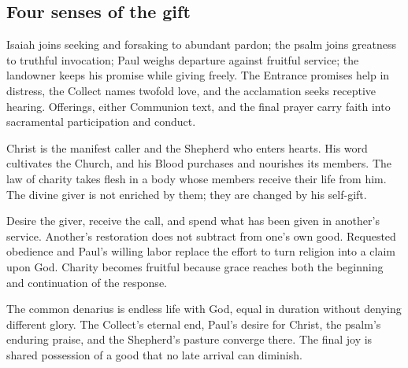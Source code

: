 \subsection{Four senses of the gift}
\begin{fourSenses}
\item[Literal.] Isaiah joins seeking and forsaking to abundant pardon; the psalm joins greatness to truthful invocation; Paul weighs departure against fruitful service; the landowner keeps his promise while giving freely. The Entrance promises help in distress, the Collect names twofold love, and the acclamation seeks receptive hearing. Offerings, either Communion text, and the final prayer carry faith into sacramental participation and conduct.

\item[Allegorical.] Christ is the manifest caller and the Shepherd who enters hearts. His word cultivates the Church, and his Blood purchases and nourishes its members. The law of charity takes flesh in a body whose members receive their life from him. The divine giver is not enriched by them; they are changed by his self-gift.

\item[Moral.] Desire the giver, receive the call, and spend what has been given in another's service. Another's restoration does not subtract from one's own good. Requested obedience and Paul's willing labor replace the effort to turn religion into a claim upon God. Charity becomes fruitful because grace reaches both the beginning and continuation of the response.

\item[Anagogical.] The common denarius is endless life with God, equal in duration without denying different glory. The Collect's eternal end, Paul's desire for Christ, the psalm's enduring praise, and the Shepherd's pasture converge there. The final joy is shared possession of a good that no late arrival can diminish.
\end{fourSenses}
